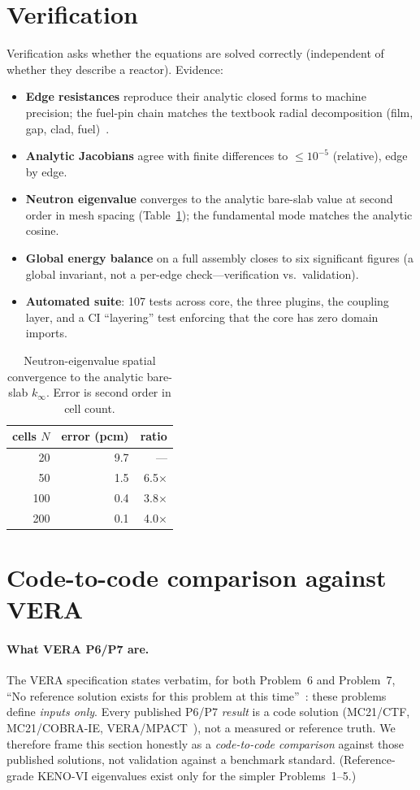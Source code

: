\documentclass[11pt]{article}
\begin{document}
\section{Verification}\label{sec:ver}
Verification asks whether the equations are solved correctly (independent of
whether they describe a reactor). Evidence:
\begin{itemize}\setlength\itemsep{1pt}
\item \textbf{Edge resistances} reproduce their analytic closed forms to machine
precision; the fuel-pin chain matches the textbook radial decomposition (film,
gap, clad, fuel)~\cite{todreas}.
\item \textbf{Analytic Jacobians} agree with finite differences to
$\le 10^{-5}$ (relative), edge by edge.
\item \textbf{Neutron eigenvalue} converges to the analytic bare-slab value at
second order in mesh spacing (Table~\ref{tab:keff}); the fundamental mode matches
the analytic cosine.
\item \textbf{Global energy balance} on a full assembly closes to six significant
figures (a global invariant, not a per-edge check---verification vs.\ validation).
\item \textbf{Automated suite}: 107 tests across core, the three plugins, the
coupling layer, and a CI ``layering'' test enforcing that the core has zero
domain imports.
\end{itemize}

\begin{table}[t]
\centering
\caption{Neutron-eigenvalue spatial convergence to the analytic bare-slab
$k_\infty$. Error is second order in cell count.}
\label{tab:keff}
\begin{tabular}{rrr}
\toprule
cells $N$ & error (pcm) & ratio \\
\midrule
20  & 9.7 & --- \\
50  & 1.5 & 6.5$\times$ \\
100 & 0.4 & 3.8$\times$ \\
200 & 0.1 & 4.0$\times$ \\
\bottomrule
\end{tabular}
\end{table}

\section{Code-to-code comparison against VERA}\label{sec:val}
\paragraph{What VERA P6/P7 are.} The VERA specification states verbatim, for both
Problem~6 and Problem~7, ``No reference solution exists for this problem at this
time''~\cite[pp.~79, 81]{vera}: these problems define \emph{inputs only}. Every
published P6/P7 \emph{result} is a code solution (MC21/CTF, MC21/COBRA-IE,
VERA/MPACT~\cite{kelly}), not a measured or reference truth. We therefore frame
this section honestly as a \emph{code-to-code comparison} against those published
solutions, not validation against a benchmark standard. (Reference-grade KENO-VI
eigenvalues exist only for the simpler Problems~1--5.)
\end{document}
